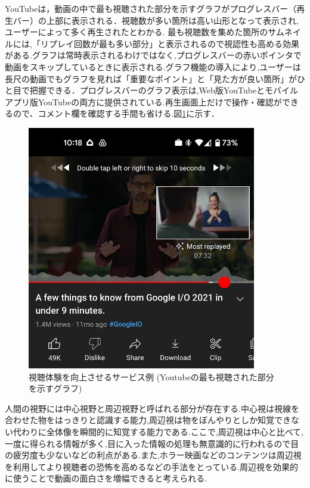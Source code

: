 YouTubeは，動画の中で最も視聴された部分を示すグラフがプログレスバー（再生バー）の上部に表示される．視聴数が多い箇所は高い山形となって表示され,ユーザーによって多く再生されたとわかる.
最も視聴数を集めた箇所のサムネイルには,「リプレイ回数が最も多い部分」と表示されるので視認性も高める効果がある.グラフは常時表示されるわけではなく,プログレスバーの赤いポインタで動画をスキップしているときに表示される.グラフ機能の導入により,ユーザーは長尺の動画でもグラフを見れば「重要なポイント」と「見た方が良い箇所」がひと目で把握できる．プログレスバーのグラフ表示は,Web版YouTubeとモバイルアプリ版YouTubeの両方に提供されている.再生画面上だけで操作・確認ができるので、コメント欄を確認する手間も省ける.図\ref{youtube}に示す．
\begin{figure}[H]
    \centering
    \includegraphics[width=10cm]{images/chapter1/YouTube.jpeg}
    \caption{視聴体験を向上させるサービス例 (Youtubeの最も視聴された部分を示すグラフ)}
    \label{youtube}
\end{figure}

人間の視野には中心視野と周辺視野と呼ばれる部分が存在する.中心視は視線を合わせた物をはっきりと認識する能力,周辺視は物をぼんやりとしか知覚できない代わりに全体像を瞬間的に知覚する能力である.ここで,周辺視は中心と比べて,一度に得られる情報が多く,目に入った情報の処理も無意識的に行われるので目の疲労度も少ないなどの利点がある.また,ホラー映画などのコンテンツは周辺視を利用してより視聴者の恐怖を高めるなどの手法をとっている.周辺視を効果的に使うことで動画の面白さを増幅できると考えられる.

